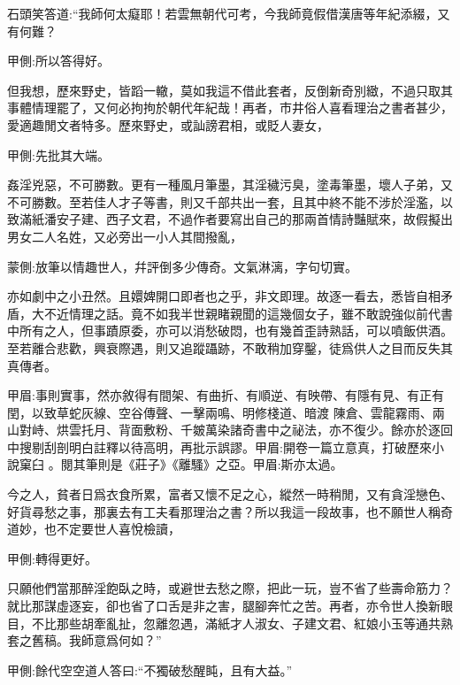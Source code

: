 \begin{parag}
    石頭笑答道:“我師何太癡耶！若雲無朝代可考，今我師竟假借漢唐等年紀添綴，又有何難？\begin{note}甲側:所以答得好。\end{note}但我想，歷來野史，皆蹈一轍，莫如我這不借此套者，反倒新奇別緻，不過只取其事體情理罷了，又何必拘拘於朝代年紀哉！再者，市井俗人喜看理治之書者甚少，愛適趣閒文者特多。歷來野史，或訕謗君相，或貶人妻女，\begin{note}甲側:先批其大端。\end{note}姦淫兇惡，不可勝數。更有一種風月筆墨，其淫穢污臭，塗毒筆墨，壞人子弟，又不可勝數。至若佳人才子等書，則又千部共出一套，且其中終不能不涉於淫濫，以致滿紙潘安子建、西子文君，不過作者要寫出自己的那兩首情詩豔賦來，故假擬出男女二人名姓，又必旁出一小人其間撥亂，\begin{note}蒙側:放筆以情趣世人，幷評倒多少傳奇。文氣淋漓，字句切實。\end{note}亦如劇中之小丑然。且嬛婢開口即者也之乎，非文即理。故逐一看去，悉皆自相矛盾，大不近情理之話。竟不如我半世親睹親聞的這幾個女子，雖不敢說強似前代書中所有之人，但事蹟原委，亦可以消愁破悶，也有幾首歪詩熟話，可以噴飯供酒。至若離合悲歡，興衰際遇，則又追蹤躡跡，不敢稍加穿鑿，徒爲供人之目而反失其真傳者。\begin{note}甲眉:事則實事，然亦敘得有間架、有曲折、有順逆、有映帶、有隱有見、有正有閏，以致草蛇灰線、空谷傳聲、一擊兩鳴、明修棧道、暗渡 陳倉、雲龍霧雨、兩山對峙、烘雲托月、背面敷粉、千皴萬染諸奇書中之祕法，亦不復少。餘亦於逐回中搜剔刮剖明白註釋以待高明，再批示誤謬。甲眉:開卷一篇立意真，打破歷來小說窠臼 。閱其筆則是《莊子》《離騷》之亞。甲眉:斯亦太過。\end{note}今之人，貧者日爲衣食所累，富者又懷不足之心，縱然一時稍閒，又有貪淫戀色、好貨尋愁之事，那裏去有工夫看那理治之書？所以我這一段故事，也不願世人稱奇道妙，也不定要世人喜悅檢讀，\begin{note}甲側:轉得更好。\end{note}只願他們當那醉淫飽臥之時，或避世去愁之際，把此一玩，豈不省了些壽命筋力？就比那謀虛逐妄，卻也省了口舌是非之害，腿腳奔忙之苦。再者，亦令世人換新眼目，不比那些胡牽亂扯，忽離忽遇，滿紙才人淑女、子建文君、紅娘小玉等通共熟套之舊稿。我師意爲何如？”\begin{note}甲側:餘代空空道人答曰:“不獨破愁醒盹，且有大益。”\end{note}
\end{parag}


